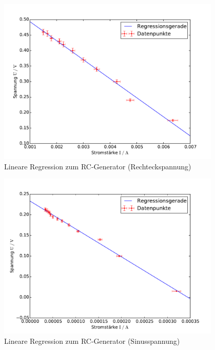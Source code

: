 \begin{figure}[h!]
	\centering
	\includegraphics[width=0.95\textwidth]{Spannung_Messung_d.pdf}
	\caption{Lineare Regression zum RC-Generator (Rechteckspannung)}
	\label{fig:Regression_Rechteck}
\end{figure}

\begin{figure}[h!]
	\centering
	\includegraphics[width=0.95\textwidth]{Spannung_Messung_e.pdf}
	\caption{Lineare Regression zum RC-Generator (Sinusspannung)}
	\label{fig:Regression_Sinus}
\end{figure}

\clearpage

